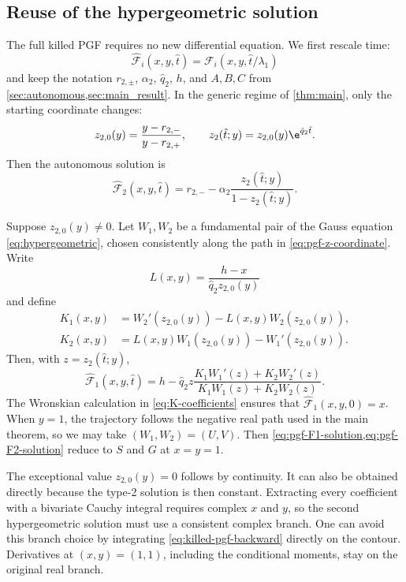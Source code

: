 \subsection{Reuse of the hypergeometric solution}

The full killed PGF requires no new differential equation. We first rescale time:
\[
\widehat{\mathcal F}_i(x,y,\hat t)
=\mathcal F_i(x,y,\hat t/\lambda_1)
\]
and keep the notation $r_{2,\pm}$, $\alpha_2$, $\hat q_2$, $h$, and $A,B,C$ from \cref{sec:autonomous,sec:main_result}. In the generic regime of \cref{thm:main}, only the starting coordinate changes:
\begin{equation}
\label{eq:pgf-z-coordinate}
z_{2,0}(y)=\frac{y-r_{2,-}}{y-r_{2,+}},
\qquad
z_2(\hat t;y)=z_{2,0}(y)\e^{\hat q_2\hat t}.
\end{equation}
Then the autonomous solution is
\begin{equation}
\label{eq:pgf-F2-solution}
\widehat{\mathcal F}_2(x,y,\hat t)
=r_{2,-}-\alpha_2
\frac{z_2(\hat t;y)}{1-z_2(\hat t;y)}.
\end{equation}

Suppose $z_{2,0}(y)\neq0$. Let $W_1,W_2$ be a fundamental pair of the Gauss equation \eqref{eq:hypergeometric}, chosen consistently along the path in \cref{eq:pgf-z-coordinate}. Write
\begin{equation*}
L(x,y)=\frac{h-x}{\hat q_2z_{2,0}(y)}
\end{equation*}
and define
\begin{align*}
K_1(x,y)
&=W_2'(z_{2,0}(y))
-L(x,y)W_2(z_{2,0}(y)),\\
K_2(x,y)
&=L(x,y)W_1(z_{2,0}(y))
-W_1'(z_{2,0}(y)).
\end{align*}
Then, with $z=z_2(\hat t;y)$,
\begin{equation}
\boxed{
\widehat{\mathcal F}_1(x,y,\hat t)
=h-\hat q_2z
\frac{K_1W_1'(z)+K_2W_2'(z)}
{K_1W_1(z)+K_2W_2(z)}.}
\label{eq:pgf-F1-solution}
\end{equation}
The Wronskian calculation in \cref{eq:K-coefficients} ensures that $\widehat{\mathcal F}_1(x,y,0)=x$. When $y=1$, the trajectory follows the negative real path used in the main theorem, so we may take $(W_1,W_2)=(U,V)$. Then \cref{eq:pgf-F1-solution,eq:pgf-F2-solution} reduce to $S$ and $G$ at $x=y=1$.

The exceptional value $z_{2,0}(y)=0$ follows by continuity. It can also be obtained directly because the type-2 solution is then constant. Extracting every coefficient with a bivariate Cauchy integral requires complex $x$ and $y$, so the second hypergeometric solution must use a consistent complex branch. One can avoid this branch choice by integrating \cref{eq:killed-pgf-backward} directly on the contour. Derivatives at $(x,y)=(1,1)$, including the conditional moments, stay on the original real branch.

